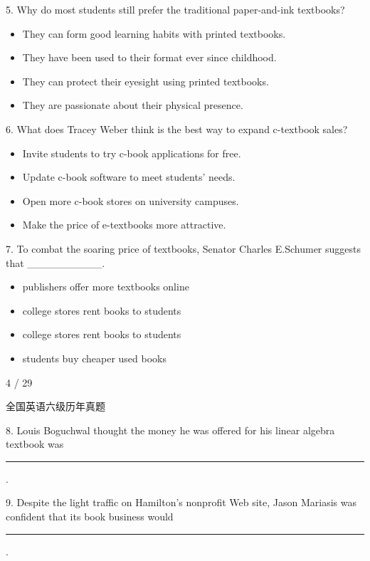 \documentclass[UTF8,11pt]{ctexart}
\begin{document}
5. Why do most students still prefer the traditional paper-and-ink textbooks?


\begin{itemize}[leftmargin=2em,itemsep=.2em,topsep=.4em]\item[A.] They can form good learning habits with printed textbooks.
\item[B.] They have been used to their format ever since childhood.
\item[C.] They can protect their eyesight using printed textbooks.
\item[D.] They are passionate about their physical presence.
\end{itemize}

6. What does Tracey Weber think is the best way to expand c-textbook sales?


\begin{itemize}[leftmargin=2em,itemsep=.2em,topsep=.4em]\item[A.] Invite students to try c-book applications for free.
\item[B.] Update c-book software to meet students' needs.
\item[C.] Open more c-book stores on university campuses.
\item[D.] Make the price of e-textbooks more attractive.
\end{itemize}

7. To combat the soaring price of textbooks, Senator Charles E.Schumer suggests that \_\_\_\_\_\_\_\_\_\_.


\begin{itemize}[leftmargin=2em,itemsep=.2em,topsep=.4em]\item[A.] publishers offer more textbooks online
\item[B.] college stores rent books to students
\item[C.] college stores rent books to students
\item[D.] students buy cheaper used books
\end{itemize}

4 / 29


全国英语六级历年真题


8. Louis Boguchwal thought the money he was offered for his linear algebra textbook was


\par\noindent\rule{.95\linewidth}{.4pt}\par .


9. Despite the light traffic on Hamilton's nonprofit Web site, Jason Mariasis was confident that its book business would\par\noindent\rule{.95\linewidth}{.4pt}\par .
\end{document}
